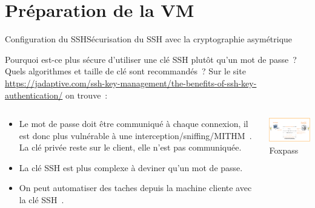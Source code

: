 \documentclass{beamer}
\begin{document}
    \section{Préparation de la VM}\label{sec:prepare-vm}
    \begin{frame}{Configuration du SSH}{Sécurisation du SSH avec la cryptographie asymétrique}
        \begin{footnotesize}
            Pourquoi est-ce plus sécure d'utiliser une clé SSH plutôt qu'un mot de passe~?
            \bigbreak
            Quels algorithmes et taille de clé sont recommandés~?
            \pause
            \bigbreak
            Sur le site \url{https://jadaptive.com/ssh-key-management/the-benefits-of-ssh-key-authentication/} on trouve~:
            \begin{columns}
                \begin{column}{0.6\textwidth}
                    \begin{itemize}
                        \item Le mot de passe doit être communiqué à chaque connexion, il est donc plus vulnérable à une interception/sniffing/MITHM~.
                        La clé privée reste sur le client, elle n'est pas communiquée.
                        \item La clé SSH est plus complexe à deviner qu'un mot de passe.
                        \item On peut automatiser des taches depuis la machine cliente avec la clé SSH~.
                    \end{itemize}
                \end{column}
                \begin{column}{0.4\textwidth}
                    \centering
                    \includegraphics[width=5cm]{image/ssh-key-diagram} \\ Foxpass\footnotemark \\
                \end{column}
            \end{columns}
        \end{footnotesize}
    \end{frame}
\end{document}
